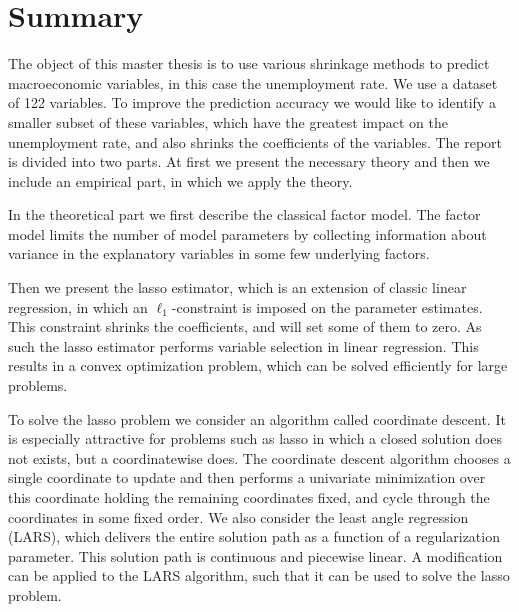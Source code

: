 \chapter{Summary}
%
The object of this master thesis is to use various shrinkage methods to predict macroeconomic variables, in this case the unemployment rate.
We use a dataset of 122 variables.
To improve the prediction accuracy we would like to identify a smaller subset of these variables, which have the greatest impact on the unemployment rate, and also shrinks the coefficients of the variables.
The report is divided into two parts. 
At first we present the necessary theory and then we include an empirical part, in which we apply the theory.

In the theoretical part we first describe the classical factor model.
The factor model limits the number of model parameters by collecting information about variance in the explanatory variables in some few underlying factors.

Then we present the lasso estimator, which is an extension of classic linear regression, in which an \(\ell_1\)-constraint is imposed on the parameter estimates.
This constraint shrinks the coefficients, and will set some of them to zero.
As such the lasso estimator performs variable selection in linear regression.
This results in a convex optimization problem, which can be solved efficiently for large problems.

To solve the lasso problem we consider an algorithm called coordinate descent.
It is especially attractive for problems such as lasso in which a closed solution does not exists, but a coordinatewise does.
The coordinate descent algorithm chooses a single coordinate to update and then performs a univariate minimization over this coordinate holding the remaining coordinates fixed, and cycle through the coordinates in some fixed order.
We also consider the least angle regression (LARS), which delivers the entire solution path as a function of a regularization parameter.
This solution path is continuous and piecewise linear.
A modification can be applied to the LARS algorithm, such that it can be used to solve the lasso problem.

